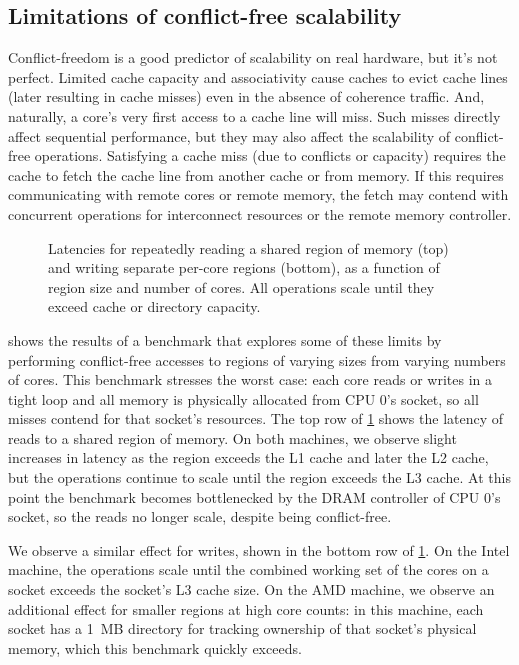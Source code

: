 \subsection{Limitations of conflict-free scalability}
\label{sec:scalability:limits}

Conflict-freedom is a good predictor of scalability on real hardware,
but it's not perfect.  Limited cache capacity and associativity cause
caches to evict cache lines (later resulting in cache
misses) even in the absence of coherence traffic.
%
And, naturally, a core's
very first access to a cache line will miss.  Such misses directly
affect sequential performance, but they may also affect the
scalability of conflict-free operations.
%
Satisfying a cache miss (due to conflicts or capacity) requires the
cache to fetch the cache line from another cache or from memory.
%
If this requires communicating with remote cores or remote memory, the
fetch may contend with concurrent operations for interconnect
resources or the remote memory controller.

\begin{figure}
  \centering
  
  \caption{Latencies for repeatedly reading a shared region of memory
    (top) and writing separate per-core regions (bottom), as a
    function of region size and number of cores.  All operations scale
    until they exceed cache or directory capacity.}
  \label{fig:memscan}
\end{figure}

 shows the results of a benchmark that explores some
of these limits by performing conflict-free accesses to regions of
varying sizes from varying numbers of cores.
%
This benchmark stresses the worst case: each core reads or writes in a
tight loop and all memory is physically allocated from CPU 0's socket,
so all misses contend for that socket's resources.
%
The top row of \cref{fig:memscan} shows the latency of reads to a
shared region of memory.
%
On both
machines, we observe slight increases in latency as the region exceeds
the L1 cache and later the L2 cache, but the operations continue to
scale until the region exceeds the L3 cache.  At this point the
benchmark becomes bottlenecked by the DRAM controller of CPU 0's
socket, so the reads no longer scale, despite being conflict-free.

We observe a similar effect for writes, shown in the bottom row of
\cref{fig:memscan}.  On the Intel machine, the operations scale until
the combined working set of the cores on a socket exceeds the socket's
L3 cache size.  On the AMD machine, we observe an additional
effect for smaller regions at high core counts: in this machine,
each socket has a 1~MB directory for tracking ownership of that
socket's physical memory, which this benchmark quickly exceeds.

